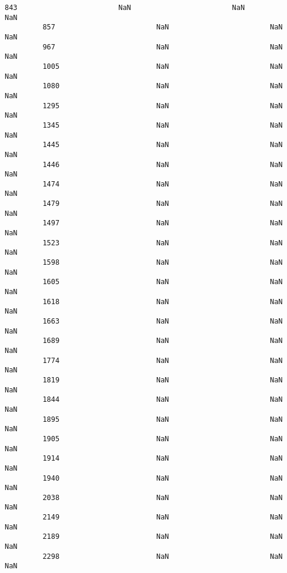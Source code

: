 \documentclass[11pt]{article}
\begin{document}
\begin{Verbatim}[commandchars=\\\{\}]
         843                        NaN                        NaN           NaN   
         857                        NaN                        NaN           NaN   
         967                        NaN                        NaN           NaN   
         1005                       NaN                        NaN           NaN   
         1080                       NaN                        NaN           NaN   
         1295                       NaN                        NaN           NaN   
         1345                       NaN                        NaN           NaN   
         1445                       NaN                        NaN           NaN   
         1446                       NaN                        NaN           NaN   
         1474                       NaN                        NaN           NaN   
         1479                       NaN                        NaN           NaN   
         1497                       NaN                        NaN           NaN   
         1523                       NaN                        NaN           NaN   
         1598                       NaN                        NaN           NaN   
         1605                       NaN                        NaN           NaN   
         1618                       NaN                        NaN           NaN   
         1663                       NaN                        NaN           NaN   
         1689                       NaN                        NaN           NaN   
         1774                       NaN                        NaN           NaN   
         1819                       NaN                        NaN           NaN   
         1844                       NaN                        NaN           NaN   
         1895                       NaN                        NaN           NaN   
         1905                       NaN                        NaN           NaN   
         1914                       NaN                        NaN           NaN   
         1940                       NaN                        NaN           NaN   
         2038                       NaN                        NaN           NaN   
         2149                       NaN                        NaN           NaN   
         2189                       NaN                        NaN           NaN   
         2298                       NaN                        NaN           NaN   
         

\end{Verbatim}
\end{document}

